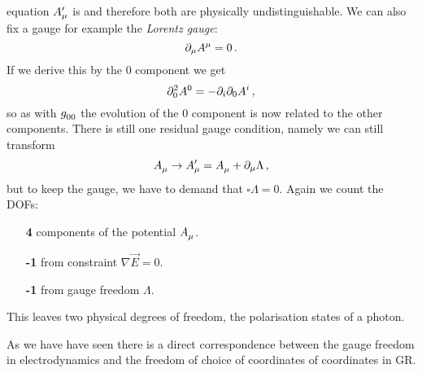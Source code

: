 equation $\tensor*{A}{*_\mu^\prime}$ is and therefore both are physically
undistinguishable. We can also fix a gauge for example the \emph{Lorentz gauge}:
\begin{equation}
\partial_\mu\tensor{A}{^\mu}=0\, .
\end{equation}
If we derive this by the 0 component we get
\begin{equation}
\partial_{0}^2\tensor{A}{^0}=-\partial_i\partial_0\tensor{A}{^i}\, ,
\end{equation}
so as with $\tensor{g}{_0_0}$ the evolution of the 0 component is now related to
the other components. There is still one residual gauge condition, namely we can
still transform
\begin{equation}
\tensor{A}{_\mu}\to\tensor*{A}{*_\mu^\prime}=
\tensor{A}{_\mu}+\partial_\mu\Lambda\, ,
\end{equation}
but to keep the gauge, we have to demand that $\square\Lambda=0$.
Again we count the DOFs:
\begin{itemize}
  \item[\color{section_color}\textsf{\textbf{4}}] components of the potential
  $\tensor{A}{_\mu}$.
  \item[\color{section_color}\textsf{\textbf{-1}}] from constraint
  $\nabla\vec{E}=0$.
  \item[\color{section_color}\textsf{\textbf{-1}}] from gauge freedom
  $\Lambda$.
\end{itemize}
This leaves two physical degrees of freedom, the polarisation states of a
photon.
\begin{remark}
As we have have seen there is a direct correspondence between the gauge freedom
in electrodynamics and the freedom of choice of coordinates of coordinates in
GR.
\end{remark}
